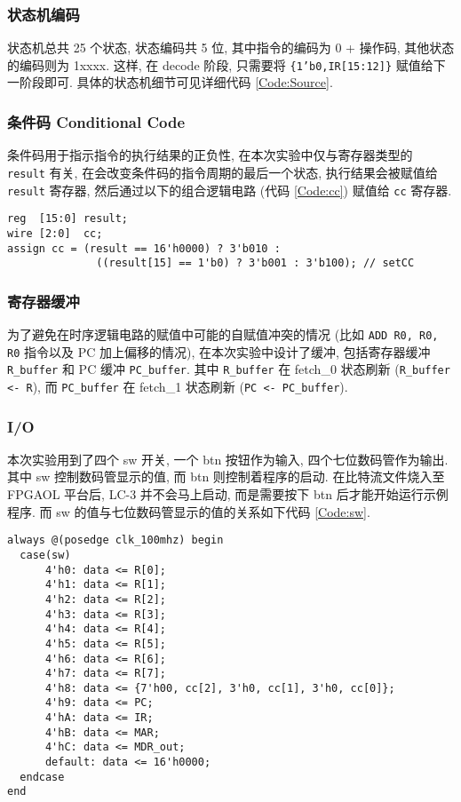 \documentclass[UTF8,fontset=fandol]{ctexart}
\begin{document}
\subsubsection*{状态机编码}
状态机总共 25 个状态, 状态编码共 5 位, 其中指令的编码为 0 + 操作码, 其他状态的编码则为 1xxxx. 这样, 在 decode 阶段, 只需要将 \texttt{\{1'b0,IR[15:12]\}} 赋值给下一阶段即可. 具体的状态机细节可见详细代码 \ref{Code:Source}.
\subsubsection*{条件码 Conditional Code}
条件码用于指示指令的执行结果的正负性, 在本次实验中仅与寄存器类型的 \texttt{result} 有关, 在会改变条件码的指令周期的最后一个状态, 执行结果会被赋值给 \texttt{result} 寄存器, 然后通过以下的组合逻辑电路 (代码 \ref{Code:cc}) 赋值给 \texttt{cc} 寄存器.
\begin{lstlisting}[style = verilogstyle, caption = 条件码的组合逻辑, label = Code:cc]
reg  [15:0] result;
wire [2:0]  cc;
assign cc = (result == 16'h0000) ? 3'b010 : 
              ((result[15] == 1'b0) ? 3'b001 : 3'b100); // setCC
\end{lstlisting}

\subsubsection*{寄存器缓冲}
为了避免在时序逻辑电路的赋值中可能的自赋值冲突的情况 (比如 \texttt{ADD R0, R0, R0} 指令以及 PC 加上偏移的情况), 在本次实验中设计了缓冲, 包括寄存器缓冲 \texttt{R\_buffer} 和 PC 缓冲 \texttt{PC\_buffer}. 其中 \texttt{R\_buffer} 在 fetch\_0 状态刷新 (\texttt{R\_buffer <- R}), 而 \texttt{PC\_buffer} 在 fetch\_1 状态刷新 (\texttt{PC <- PC\_buffer}).
\subsubsection*{I/O}
本次实验用到了四个 sw 开关, 一个 btn 按钮作为输入, 四个七位数码管作为输出. 其中 sw 控制数码管显示的值, 而 btn 则控制着程序的启动. 在比特流文件烧入至 FPGAOL 平台后, LC-3 并不会马上启动, 而是需要按下 btn 后才能开始运行示例程序. 而 sw 的值与七位数码管显示的值的关系如下代码 \ref{Code:sw}.
\begin{lstlisting}[style = verilogstyle, caption = sw 与 hexplay 的关系, label = Code:sw]
  always @(posedge clk_100mhz) begin
  case(sw)
      4'h0: data <= R[0];
      4'h1: data <= R[1];
      4'h2: data <= R[2];
      4'h3: data <= R[3];
      4'h4: data <= R[4];
      4'h5: data <= R[5];
      4'h6: data <= R[6];
      4'h7: data <= R[7];
      4'h8: data <= {7'h00, cc[2], 3'h0, cc[1], 3'h0, cc[0]};
      4'h9: data <= PC;
      4'hA: data <= IR;
      4'hB: data <= MAR;
      4'hC: data <= MDR_out;
      default: data <= 16'h0000;
  endcase
end
\end{lstlisting}
\end{document}
